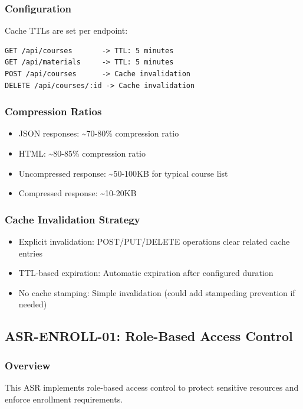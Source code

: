 \documentclass[12pt,oneside,a4paper]{article}
\begin{document}
\subsubsection{Configuration}
Cache TTLs are set per endpoint:
\begin{lstlisting}
GET /api/courses       -> TTL: 5 minutes
GET /api/materials     -> TTL: 5 minutes
POST /api/courses      -> Cache invalidation
DELETE /api/courses/:id -> Cache invalidation
\end{lstlisting}

\subsubsection{Compression Ratios}
\begin{itemize}
    \item JSON responses: \textasciitilde 70-80\% compression ratio
    \item HTML: \textasciitilde 80-85\% compression ratio
    \item Uncompressed response: \textasciitilde 50-100KB for typical course list
    \item Compressed response: \textasciitilde 10-20KB
\end{itemize}

\subsubsection{Cache Invalidation Strategy}
\begin{itemize}
    \item Explicit invalidation: POST/PUT/DELETE operations clear related cache entries
    \item TTL-based expiration: Automatic expiration after configured duration
    \item No cache stamping: Simple invalidation (could add stampeding prevention if needed)
\end{itemize}

\subsection{ASR-ENROLL-01: Role-Based Access Control}

\subsubsection{Overview}
This ASR implements role-based access control to protect sensitive resources and enforce enrollment requirements.
\end{document}
